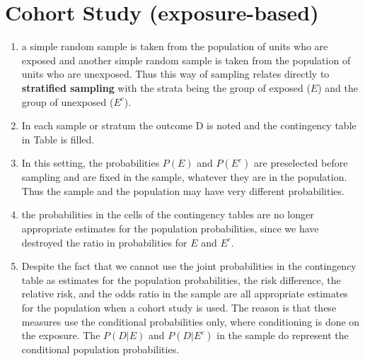 \section{Cohort Study (exposure-based)}

\begin{enumerate}
    \item a simple random sample is taken from the population of units who are exposed and another simple random sample is taken from the population of units who are unexposed.
    Thus this way of sampling relates directly to \textbf{stratified sampling} with the strata being the group of exposed ($E$) and the group of unexposed ($E^c$). 
    \hfill \cite{statistics/book/Statistics-for-Data-Scientists/Maurits-Kaptein}

    \item In each sample or stratum the outcome D is noted and the contingency table in Table  is filled.
    \hfill \cite{statistics/book/Statistics-for-Data-Scientists/Maurits-Kaptein}

    \item In this setting, the probabilities $P (E)$ and $P (E^c)$ are preselected before sampling and are fixed in the sample, whatever they are in the population. 
    Thus the sample and the population may have very different probabilities.
    \hfill \cite{statistics/book/Statistics-for-Data-Scientists/Maurits-Kaptein}

    \item the probabilities in the cells of the contingency tables are no longer appropriate estimates for the population probabilities, since we have destroyed the ratio in probabilities for $E$ and $E^c$.
    \hfill \cite{statistics/book/Statistics-for-Data-Scientists/Maurits-Kaptein}

    \item Despite the fact that we cannot use the joint probabilities in the contingency table as estimates for the population probabilities, the risk difference, the relative risk, and the odds ratio in the sample are all appropriate estimates for the population when a cohort study is used. 
    The reason is that these measures use the conditional probabilities only, where conditioning is done on the exposure. The $P (D|E)$ and $P (D|E^c)$ in the sample do represent the conditional population probabilities.
    \hfill \cite{statistics/book/Statistics-for-Data-Scientists/Maurits-Kaptein}
\end{enumerate}









